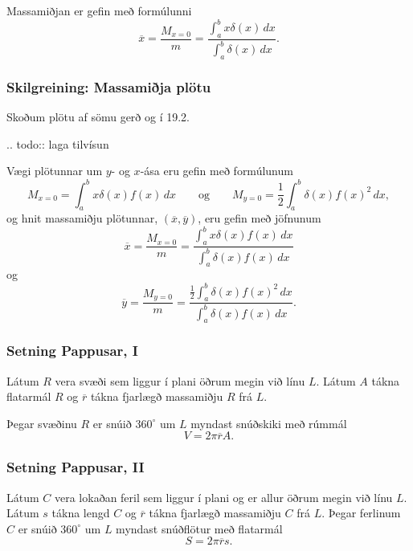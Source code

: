 \documentclass[icelandic,a4paper,12pt]{article}
\begin{document}
Massamiðjan er gefin með formúlunni
$$\overline{x}=\frac{M_{x=0}}{m}   =
\frac{\int_a^b x\delta(x)\,dx}{\int_a^b \delta(x)\,dx}.$$

\subsubsection{Skilgreining: Massamiðja plötu}
Skoðum plötu af sömu gerð og í 19.2. 

.. todo::
  laga tilvísun

Vægi plötunnar um $y$- og $x$-ása eru gefin með formúlunum
$$M_{x=0}=\int_a^b x\delta(x)f(x)\,dx 
\qquad\mbox{og}\qquad
M_{y=0}=\frac{1}{2}\int_a^b \delta(x)f(x)^2\,dx,$$
og hnit massamiðju plötunnar, $(\overline{x}, \overline{y})$, eru
gefin með jöfnunum
$$\overline{x}=\frac{M_{x=0}}{m}=
\frac{\int_a^b x\delta(x)f(x)\,dx}{\int_a^b \delta(x)f(x)\,dx}
$$
og
$$
\overline{y}=\frac{M_{y=0}}{m}=
\frac{\frac{1}{2}\int_a^b \delta(x)f(x)^2\,dx}{\int_a^b
\delta(x)f(x)\,dx}.$$

\subsubsection{Setning Pappusar, I}
Látum $R$ vera svæði sem liggur í plani öðrum megin við línu $L$. 
Látum $A$ tákna flatarmál $R$ og $\overline{r}$ tákna fjarlægð massamiðju $R$
frá $L$. 

Þegar svæðinu $R$ er snúið $360^\circ$ um $L$ myndast snúðskiki með rúmmál 
$$V=2\pi\overline{r}A.$$

\subsubsection{Setning Pappusar, II}
Látum $C$ vera lokaðan feril sem liggur í plani og er allur öðrum megin við línu $L$. 
Látum $s$ tákna lengd $C$ og $\overline{r}$ tákna fjarlægð massamiðju $C$ frá $L$.  
Þegar ferlinum $C$ er snúið $360^\circ$ um $L$ myndast snúðflötur með flatarmál 
$$S=2\pi\overline{r}s.$$
\end{document}

